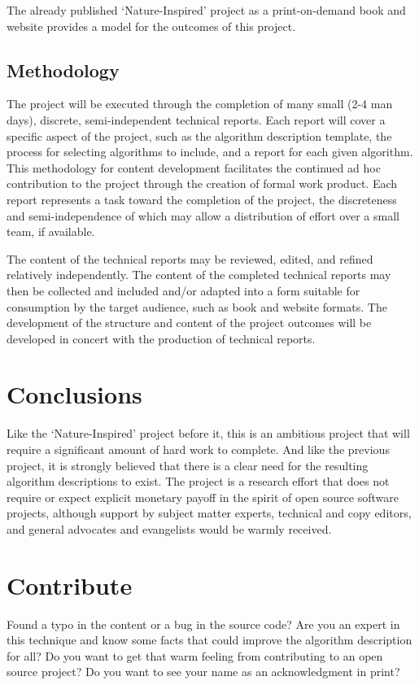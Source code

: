 \documentclass[a4paper, 11pt]{article}
\begin{document}
The already published `Nature-Inspired' project as a print-on-demand book and website provides a model for the outcomes of this project.

\subsection{Methodology}
The project will be executed through the completion of many small (2-4 man days), discrete, semi-independent technical reports. Each report will cover a specific aspect of the project, such as the algorithm description template, the process for selecting algorithms to include, and a report for each given algorithm. This methodology for content development facilitates the continued ad hoc contribution to the project through the creation of formal work product. Each report represents a task toward the completion of the project, the discreteness and semi-independence of which may allow a distribution of effort over a small team, if available.

The content of the technical reports may be reviewed, edited, and refined relatively independently. The content of the completed technical reports may then be collected and included and/or adapted into a form suitable for consumption by the target audience, such as book and website formats. The development of the structure and content of the project outcomes will be developed in concert with the production of technical reports.

\section{Conclusions}
\label{sec:conclusions}
Like the `Nature-Inspired' project before it, this is an ambitious project that will require a significant amount of hard work to complete. And like the previous project, it is strongly believed that there is a clear need for the resulting algorithm descriptions to exist. 
The project is a research effort that does not require or expect explicit monetary payoff in the spirit of open source software projects, although support by subject matter experts, technical and copy editors, and general advocates and evangelists would be warmly received. 

% 
% 
\section{Contribute}
\label{sec:contribute}
Found a typo in the content or a bug in the source code? 
Are you an expert in this technique and know some facts that could improve the algorithm description for all?
Do you want to get that warm feeling from contributing to an open source project? 
Do you want to see your name as an acknowledgment in print?
\end{document}
